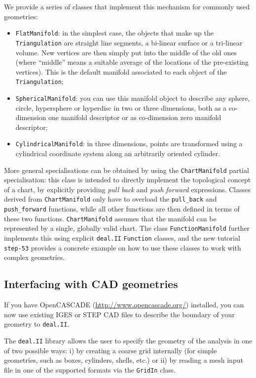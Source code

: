 \documentclass{ansarticle}
\newcommand{\specialword}[1]{\texttt{#1}}
\newcommand{\dealii}{{\specialword{deal.II}}}
\begin{document}
We provide a series of classes that implement this mechanism for
commonly used geometries:
\begin{itemize}
\item \verb|FlatManifold|: in the simplest case, the
  objects that make up the \verb|Triangulation| are straight line
  segments, a bi-linear surface or a tri-linear volume. New vertices
  are then simply put into the middle of the old ones (where
  ``middle'' means a suitable average of the locations of the
  pre-existing vertices). This is the default manifold associated to
  each object of the \verb|Triangulation|;
\item \verb|SphericalManifold|: you can use this manifold object to
  describe any sphere, circle, hypersphere or hyperdisc in two or
  three dimensions, both as a co-dimension one manifold descriptor or
  as co-dimension zero manifold descriptor;
\item \verb|CylindricalManifold|: in three dimensions, points are
  transformed using a cylindrical coordinate system along an
  arbitrarily oriented cylinder.
\end{itemize}

More general specialisations can be obtained by using the
\verb|ChartManifold| partial specialisation: this class is intended to
directly implement the topological concept of a chart, by explicitly
providing \emph{pull back} and \emph{push forward} expressions. Classes
derived from \verb|ChartManifold| only have to overload the \verb|pull_back|
and \verb|push_forward| functions, while all other functions are then defined
in terms of these two functions. \verb|ChartManifold| assumes that the
manifold can be represented by a single, globally valid chart.
The
class \verb|FunctionManifold| further implements this using explicit \dealii{}
\verb|Function| classes, and the new tutorial \verb|step-53| provides a
concrete example on how to use these classes to work with complex
geometries.

\subsection{Interfacing with CAD geometries}

If you have OpenCASCADE (\url{http://www.opencascade.org/})
installed\cite{opencascade-web-page}, you can now use existing IGES or
STEP CAD files to describe the boundary of your geometry to \dealii{}.

The \dealii{} library allows the user to specify the geometry of the
analysis in one of two possible ways: i) by creating a coarse grid
internally (for simple geometries, such as boxes, cylinders, shells,
etc.) or ii) by reading a mesh input file in one of the supported
formats via the \verb|GridIn| class.
\end{document}
